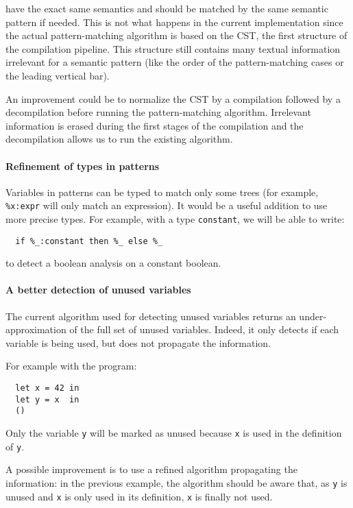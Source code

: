 \documentclass[10pt,a4paper]{article}
\begin{document}
have the exact same semantics and should be matched by the same
semantic pattern if needed. This is not what happens in the current
implementation since the actual pattern-matching algorithm is based on
the CST, the first structure of the compilation pipeline. This
structure still contains many textual information irrelevant for a
semantic pattern (like the order of the pattern-matching cases or the
leading vertical bar).

An improvement could be to normalize the CST by a compilation followed
by a decompilation before running the pattern-matching
algorithm. Irrelevant information is erased during the first stages of
the compilation and the decompilation allows us to run the existing
algorithm.

\paragraph{Refinement of types in patterns}

Variables in patterns can be typed to match only some trees (for
example, \verb|%x:expr| will only match an expression).
It would be a useful addition to use more precise types. For example,
with a type \verb|constant|, we will be able to write:
\begin{verbatim}
  if %_:constant then %_ else %_
\end{verbatim}
to detect a boolean analysis on a constant boolean.

\paragraph{A better detection of unused variables}

The current algorithm used for detecting unused variables returns an
under-approximation of the full set of unused variables. Indeed, it
only detects if each variable is being used, but does not propagate
the information.

For example with the program:
\begin{verbatim}
  let x = 42 in
  let y = x  in
  ()
\end{verbatim}

Only the variable \verb|y| will be marked as unused because
\verb|x| is used in the definition of \verb|y|.

A possible improvement is to use a refined algorithm propagating the
information: in the previous example, the algorithm should be aware
that, as \verb|y| is unused and \verb|x| is only used in its
definition, \verb|x| is finally not used.
\end{document}
